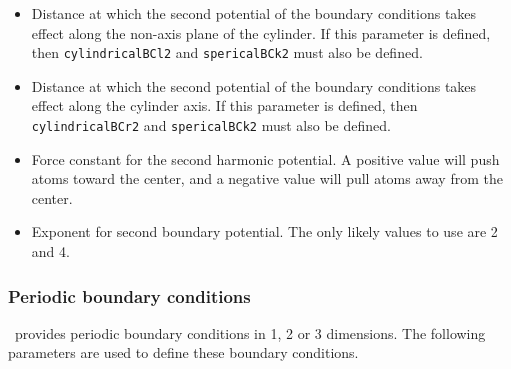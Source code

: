 \begin{itemize}
\item
{}
{Distance at which the second potential of the boundary conditions takes
effect along the non-axis plane of the cylinder.
If this parameter is defined, then {\tt cylindricalBCl2} and {\tt spericalBCk2} must also
be defined.}

\item
{}
{Distance at which the second potential of the boundary conditions takes
effect along the cylinder axis.
If this parameter is defined, then {\tt cylindricalBCr2} and {\tt spericalBCk2} must also
be defined.}

\item
{}
{Force constant for the second harmonic potential.  A positive
value will push atoms toward the center, and a negative
value will pull atoms away from the center.}

\item
{}
{Exponent for second boundary potential.  The only likely values to
use are 2 and 4.}

\end{itemize}


\subsubsection{Periodic boundary conditions}

\NAMD\ provides periodic boundary conditions in 1, 2 or 3 dimensions.
The following parameters are used to define these boundary conditions.  


